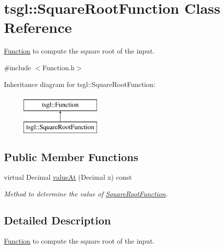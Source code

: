 \hypertarget{classtsgl_1_1_square_root_function}{\section{tsgl\-:\-:\-Square\-Root\-Function \-Class \-Reference}
\label{classtsgl_1_1_square_root_function}
}


\hyperlink{classtsgl_1_1_function}{\-Function} to compute the square root of the input.  




{\ttfamily \#include $<$\-Function.\-h$>$}

\-Inheritance diagram for tsgl\-:\-:\-Square\-Root\-Function\-:\begin{figure}[H]
\begin{center}
\leavevmode
\includegraphics[height=2.000000cm]{classtsgl_1_1_square_root_function}
\end{center}
\end{figure}
\subsection*{\-Public \-Member \-Functions}
\begin{DoxyCompactItemize}
\item 
virtual \-Decimal \hyperlink{classtsgl_1_1_square_root_function_a25f6192ef7b12b80c4a14186e1cde97c}{value\-At} (\-Decimal x) const 
\begin{DoxyCompactList}\small\item\em \-Method to determine the value of \hyperlink{classtsgl_1_1_square_root_function}{\-Square\-Root\-Function}. \end{DoxyCompactList}\end{DoxyCompactItemize}


\subsection{\-Detailed \-Description}
\hyperlink{classtsgl_1_1_function}{\-Function} to compute the square root of the input. 

